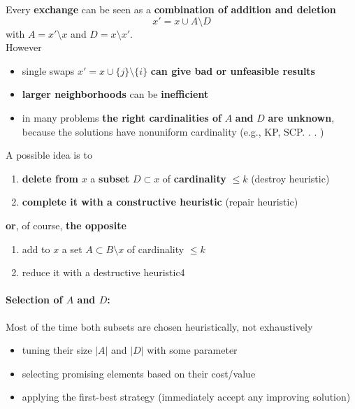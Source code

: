 \documentclass[11pt]{article}
\begin{document}
	Every \textbf{exchange} can be seen as a \textbf{combination of addition and deletion}
	$$ x' = x \cup A \setminus D $$
	with $A = x' \setminus x$ and $D = x \setminus x'$.\\
	
	However
	\begin{itemize}
		\item single swaps $x' = x \cup \{j\} \setminus \{i\}$ \textbf{can give bad or unfeasible results}
		
		\item \textbf{larger neighborhoods} can be \textbf{inefficient}
		
		\item in many problems \textbf{the right cardinalities of} $A$ \textbf{and} $D$ \textbf{are unknown}, because the solutions have nonuniform cardinality (e.g., KP, SCP. . . )
	\end{itemize}
	
	A possible idea is to
	\begin{enumerate}
		\item \textbf{delete from} $x$ a \textbf{subset} $D \subset x$ of \textbf{cardinality} $\leq k$ (destroy heuristic)
		\item \textbf{complete it with a constructive heuristic} (repair heuristic)
	\end{enumerate}
	
	\textbf{or}, of course, \textbf{the opposite}
	\begin{enumerate}
		\item add to $x$ a set $A \subset B \setminus x$ of cardinality $\leq k$
		\item reduce it with a destructive heuristic4
	\end{enumerate}
	
	\paragraph{Selection of $A$ and $D$:} Most of the time both subsets are chosen heuristically, not exhaustively
	\begin{itemize}
		\item tuning their size $|A|$ and $|D|$ with some parameter
		
		\item selecting promising elements based on their cost/value
		
		\item applying the first-best strategy (immediately accept any improving solution)
	\end{itemize}
	
\end{document}
